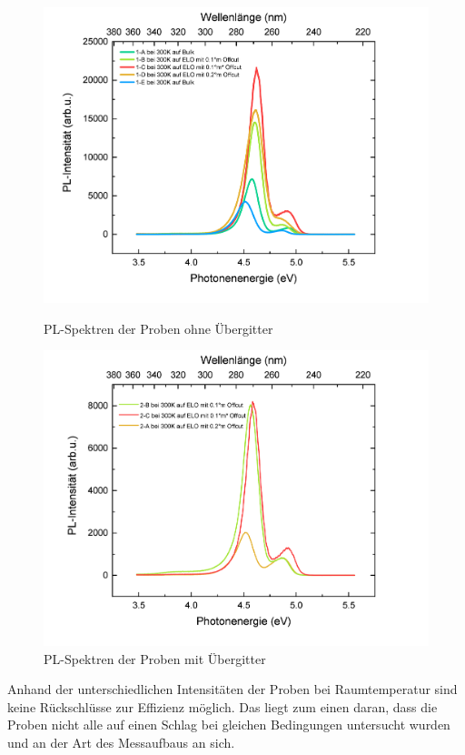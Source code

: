 \begin{figure}[htb]
    \centering
    \begin{minipage}[t]{0.49\linewidth}
        \centering
        \includegraphics[width=\linewidth]{Bilder/TS4045Uebersicht.pdf}
        \caption{PL-Spektren der Proben ohne Übergitter}
    \end{minipage}%
    \hfill
    \begin{minipage}[t]{0.49\linewidth}
        \centering
        \includegraphics[width=\linewidth]{Bilder/TS4048Uebersicht.pdf}
        \caption{PL-Spektren der Proben mit Übergitter}
    \end{minipage}
\end{figure}
\vspace{1cm}
\raggedright
Anhand der unterschiedlichen Intensitäten der Proben bei Raumtemperatur sind keine Rückschlüsse zur Effizienz möglich. 
Das liegt zum einen daran, dass die Proben nicht alle auf einen Schlag bei gleichen Bedingungen untersucht wurden und an der Art des Messaufbaus an sich. 






